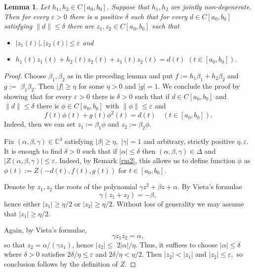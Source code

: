 \documentclass[12pt,fleqn]{amsart}
\newtheorem{lemma}[theorem]{Lemma}
\theoremstyle{definition}
\numberwithin{equation}{section}
\theoremstyle{remark}
\begin{document}
\begin{lemma}\label{l4.10}
    Let $h_{1}, h_{2}\in C\left[a_{0}, b_{0}\right]$. Suppose that $h_1, h_2$ are jointly non-degenerate. Then for every $\varepsilon>0$ there is a positive $\delta$ such that for every $d\in C\left[a_{0}, b_{0}\right]$ satisfying $\|d\| \leqslant \delta$ there are $z_{1}, z_{2}\in C\left[a_{0}, b_{0}\right]$ such that 
    \begin{itemize}
        \item $\left|z_{1}(t)\right|,\left|z_{2}(t)\right| \leqslant \varepsilon$ and \item $h_{1}(t) z_{1}(t)+h_{2}(t) z_{2}(t)+z_{1}(t) z_{2}(t)=d(t)$ $(t \in\left[a_{0}, b_{0}\right])$.
    \end{itemize}
\end{lemma}

\begin{proof}
    Choose $\beta_{1}, \beta_{2}$ as in the preceding lemma and put $f:=h_{1} \beta_{1}+h_{2} \beta_{2}$ and $g:=$ $\beta_{1} \beta_{2}$. Then $|f|\geqslant \eta$ for some $\eta > 0$  and $|g|=1$. We conclude the proof by showing that for every $\varepsilon>0$ there is $\delta>0$ such that if $d\in C[a_{0}, b_{0}]$ and $\|d\| \leqslant \delta$ there is $\phi \in C[a_{0}, b_{0}]$ with $\|\phi\| \leqslant \varepsilon$ and 
    \[
        f(t) \phi(t)+g(t) \phi^{2}(t)=d(t) \quad(t\in \left[a_{0}, b_{0}\right]).
    \]
    Indeed, then we can set $z_{1}:=\beta_{1} \phi$ and $z_{2}:=\beta_{2} \phi$.

    Fix $(\alpha, \beta, \gamma) \in \mathbb{C}^{3}$ satisfying $|\beta| \geqslant \eta,$ $|\gamma|=1$ and arbitrary, strictly positive $\eta, \varepsilon.$ 
    It is enough to find $\delta>0$ such that if  $|\alpha| \leqslant \delta$ then $(\alpha, \beta, \gamma) \in \Delta$ and $|Z(\alpha, \beta, \gamma)| \leqslant \varepsilon$. Indeed, by Remark \ref{rm2}, this allows us to define function $\phi$ as  $\phi(t) :=  Z(-d(t), f(t), g(t))$ for $t\in [a_0,b_0].$
    
    Denote by $z_{1}, z_{2}$ the roots of the polynomial $\gamma z^{2}+\beta z+\alpha$. By Vieta's formulae
    \[
        \gamma\left(z_{1}+z_{2}\right)=-\beta,
    \] 
    hence either $\left|z_{1}\right| \geqslant \eta / 2$ or $\left|z_{2}\right| \geqslant \eta / 2$. Without loss of generality we may assume that $\left|z_{1}\right| \geqslant \eta / 2.$

    Again, by Vieta's formulae, 
    \[
        \gamma z_{1} z_{2}=\alpha,
    \] 
    so that $z_{2}=\alpha/(\gamma z_1)$, hence $\left|z_{2}\right| \leq$ $2|\alpha| / \eta$. Thus, it suffices to choose $|\alpha| \leqslant \delta$ where $\delta>0$ satisfies $2 \delta / \eta \leqslant \varepsilon$ and $2 \delta / \eta<\eta / 2$. Then $\left|z_{2}\right|<\left|z_{1}\right|$ and $\left|z_{2}\right| \leqslant \varepsilon,$ so conclusion follows by the definition of $Z.$    
\end{proof}
\end{document}
